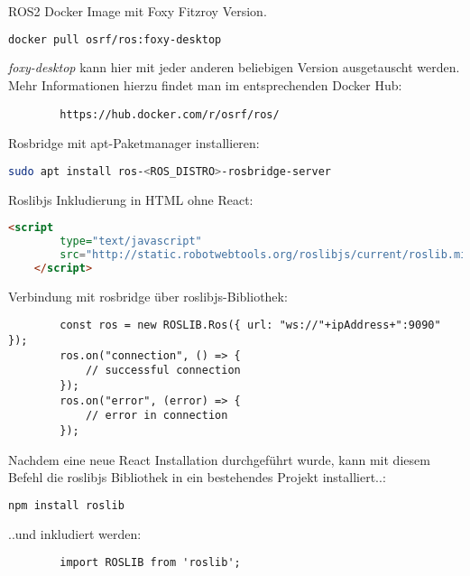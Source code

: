 \begin{flushleft}
    \label{frontend_install}ROS2 Docker Image mit Foxy Fitzroy Version.
    \begin{lstlisting}[language=bash]
        docker pull osrf/ros:foxy-desktop 
    \end{lstlisting}

    \textit{foxy-desktop} kann hier mit jeder anderen beliebigen Version ausgetauscht werden. Mehr Informationen hierzu findet man im entsprechenden Docker Hub: 
    \begin{lstlisting}
        https://hub.docker.com/r/osrf/ros/
    \end{lstlisting}

    Rosbridge mit apt-Paketmanager installieren:
    \begin{lstlisting}[language=bash]
        sudo apt install ros-<ROS_DISTRO>-rosbridge-server 
    \end{lstlisting}

    Roslibjs Inkludierung in HTML ohne React:
    \begin{lstlisting}[language=html]
    <script 
        type="text/javascript" 
        src="http://static.robotwebtools.org/roslibjs/current/roslib.min.js">
    </script> 
    \end{lstlisting}

    Verbindung mit rosbridge über roslibjs-Bibliothek:
    \begin{lstlisting}
        const ros = new ROSLIB.Ros({ url: "ws://"+ipAddress+":9090" });
        ros.on("connection", () => {
            // successful connection
        });
        ros.on("error", (error) => {
            // error in connection
        });
    \end{lstlisting}

    Nachdem eine neue React Installation durchgeführt wurde, kann mit diesem Befehl die roslibjs Bibliothek in ein bestehendes Projekt installiert..:
    \begin{lstlisting}[language=bash]
        npm install roslib 
    \end{lstlisting}
    
    ..und inkludiert werden:
    
    \begin{lstlisting}
        import ROSLIB from 'roslib';
    \end{lstlisting}
\end{flushleft}